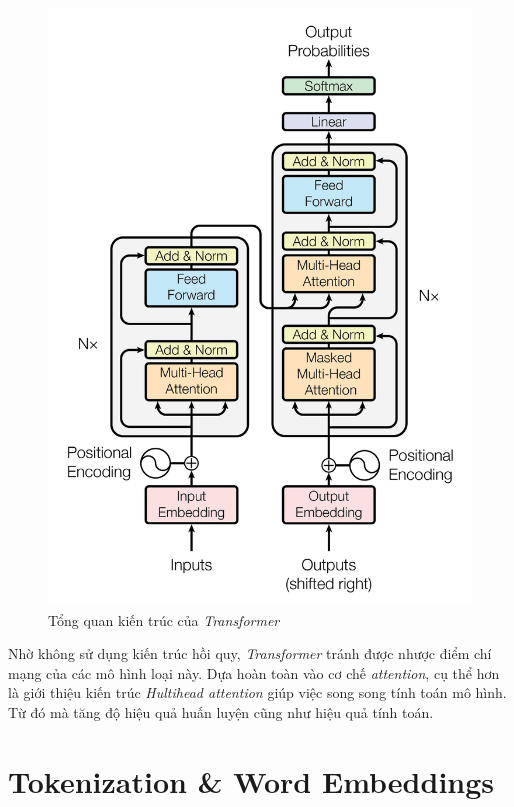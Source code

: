 \begin{figure}[H]
    \begin{center}
        \includegraphics[scale=0.25]{images/attention-is-all-you-need}
        \caption{Tổng quan kiến trúc của \textit{Transformer}}
        \label{fig:attetion-is-all-you-need}
    \end{center}
\end{figure}

Nhờ không sử dụng kiến trúc hồi quy, \textit{Transformer} tránh được nhược điểm chí mạng của các mô hình loại này. Dựa hoàn toàn vào cơ chế \textit{attention}, cụ thể hơn là giới thiệu kiến trúc \textit{Hultihead attention} giúp việc song song tính toán mô hình. Từ đó mà tăng độ hiệu quả huấn luyện cũng như hiệu quả tính toán.

\section{Tokenization \& Word Embeddings}

